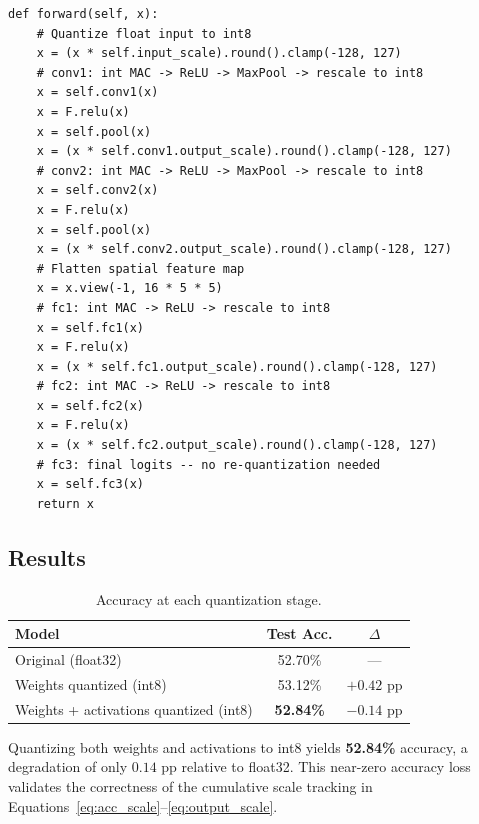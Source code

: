 \documentclass[11pt, letterpaper]{article}
\begin{document}
\begin{lstlisting}[caption={Quantized forward pass --- \texttt{NetQuantized.forward}.}]
def forward(self, x):
    # Quantize float input to int8
    x = (x * self.input_scale).round().clamp(-128, 127)
    # conv1: int MAC -> ReLU -> MaxPool -> rescale to int8
    x = self.conv1(x)
    x = F.relu(x)
    x = self.pool(x)
    x = (x * self.conv1.output_scale).round().clamp(-128, 127)
    # conv2: int MAC -> ReLU -> MaxPool -> rescale to int8
    x = self.conv2(x)
    x = F.relu(x)
    x = self.pool(x)
    x = (x * self.conv2.output_scale).round().clamp(-128, 127)
    # Flatten spatial feature map
    x = x.view(-1, 16 * 5 * 5)
    # fc1: int MAC -> ReLU -> rescale to int8
    x = self.fc1(x)
    x = F.relu(x)
    x = (x * self.fc1.output_scale).round().clamp(-128, 127)
    # fc2: int MAC -> ReLU -> rescale to int8
    x = self.fc2(x)
    x = F.relu(x)
    x = (x * self.fc2.output_scale).round().clamp(-128, 127)
    # fc3: final logits -- no re-quantization needed
    x = self.fc3(x)
    return x
\end{lstlisting}

\subsection{Results}

\begin{table}[H]
  \centering
  \caption{Accuracy at each quantization stage.}
  \begin{tabular}{lcc}
    \toprule
    \textbf{Model}                           & \textbf{Test Acc.} & \textbf{$\Delta$} \\
    \midrule
    Original (float32)                       & 52.70\%   & ---         \\
    Weights quantized (int8)                 & 53.12\%   & $+0.42$ pp  \\
    Weights + activations quantized (int8)   & \textbf{52.84\%}  & $-0.14$ pp  \\
    \bottomrule
  \end{tabular}
\end{table}

Quantizing both weights and activations to int8 yields \textbf{52.84\%} accuracy,
a degradation of only $0.14$ pp relative to float32. This near-zero accuracy loss
validates the correctness of the cumulative scale tracking in
Equations~\eqref{eq:acc_scale}--\eqref{eq:output_scale}.

\end{document}
